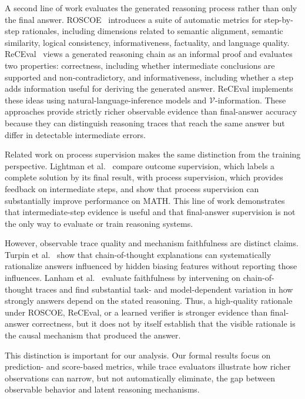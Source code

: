 \documentclass[acmsmall,screen,review,anonymous]{acmart}
\begin{document}
A second line of work evaluates the generated reasoning process rather than
only the final answer. ROSCOE~\cite{Golovneva2023ROSCOE} introduces a suite of
automatic metrics for step-by-step rationales, including dimensions related
to semantic alignment, semantic similarity, logical consistency,
informativeness, factuality, and language quality. ReCEval~\cite{Prasad2023ReCEval}
views a generated reasoning chain as an informal proof and evaluates two
properties: correctness, including whether intermediate conclusions are
supported and non-contradictory, and informativeness, including whether a step
adds information useful for deriving the generated answer. ReCEval implements
these ideas using natural-language-inference models and
$\mathcal{V}$-information. These approaches provide strictly richer observable
evidence than final-answer accuracy because they can distinguish reasoning
traces that reach the same answer but differ in detectable intermediate
errors.

Related work on process supervision makes the same distinction from the
training perspective. Lightman et al.~\cite{Lightman2024Verify} compare
outcome supervision, which labels a complete solution by its final result,
with process supervision, which provides feedback on intermediate steps, and
show that process supervision can substantially improve performance on MATH.
This line of work demonstrates that intermediate-step evidence is useful and
that final-answer supervision is not the only way to evaluate or train
reasoning systems.

However, observable trace quality and mechanism faithfulness are distinct
claims. Turpin et al.~\cite{Turpin2023UnfaithfulCoT} show that chain-of-thought
explanations can systematically rationalize answers influenced by hidden
biasing features without reporting those influences. Lanham et
al.~\cite{Lanham2023Faithfulness} evaluate faithfulness by intervening on
chain-of-thought traces and find substantial task- and model-dependent
variation in how strongly answers depend on the stated reasoning. Thus, a
high-quality rationale under ROSCOE, ReCEval, or a learned verifier is stronger
evidence than final-answer correctness, but it does not by itself establish
that the visible rationale is the causal mechanism that produced the answer.

This distinction is important for our analysis. Our formal results focus on
prediction- and score-based metrics, while trace evaluators illustrate how
richer observations can narrow, but not automatically eliminate, the gap
between observable behavior and latent reasoning mechanisms.
\end{document}
